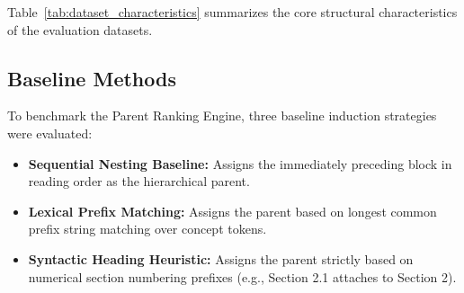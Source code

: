 \documentclass[12pt,a4paper]{report}
\begin{document}
Table~\ref{tab:dataset_characteristics} summarizes the core structural characteristics of the evaluation datasets.

\begin{table}[h!]
\centering
\caption{Benchmark Datasets and Evaluation Corpus Characteristics}
\label{tab:dataset_characteristics}
\end{table}

\subsection{Baseline Methods}
To benchmark the Parent Ranking Engine, three baseline induction strategies were evaluated:
\begin{itemize}
    \item \textbf{Sequential Nesting Baseline:} Assigns the immediately preceding block in reading order as the hierarchical parent.
    \item \textbf{Lexical Prefix Matching:} Assigns the parent based on longest common prefix string matching over concept tokens.
    \item \textbf{Syntactic Heading Heuristic:} Assigns the parent strictly based on numerical section numbering prefixes (e.g., Section 2.1 attaches to Section 2).
\end{itemize}
\end{document}
